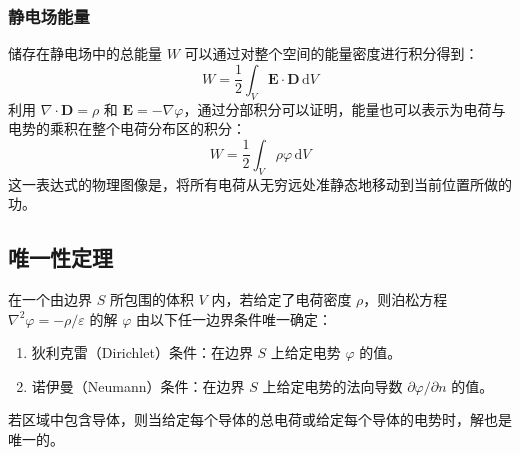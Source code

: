 \documentclass[fontset=none]{ctexart}
\begin{document}
\subsubsection{静电场能量}
储存在静电场中的总能量 $W$ 可以通过对整个空间的能量密度进行积分得到：
\begin{equation}
    W = \frac{1}{2} \int_V \bm{E} \cdot \bm{D} \, \mathrm{d}V
\end{equation}
利用 $\nabla \cdot \bm{D} = \rho$ 和 $\bm{E} = -\nabla \varphi$，通过分部积分可以证明，能量也可以表示为电荷与电势的乘积在整个电荷分布区的积分：
\begin{equation}
    W = \frac{1}{2} \int_V \rho \varphi \, \mathrm{d}V
\end{equation}
这一表达式的物理图像是，将所有电荷从无穷远处准静态地移动到当前位置所做的功。

\subsection{唯一性定理}
\begin{theorem}[唯一性定理]
在一个由边界 $S$ 所包围的体积 $V$ 内，若给定了电荷密度 $\rho$，则泊松方程 $\nabla^2 \varphi = -\rho/\varepsilon$ 的解 $\varphi$ 由以下任一边界条件唯一确定：
\begin{enumerate}
    \item 狄利克雷（Dirichlet）条件：在边界 $S$ 上给定电势 $\varphi$ 的值。
    \item 诺伊曼（Neumann）条件：在边界 $S$ 上给定电势的法向导数 $\partial \varphi / \partial n$ 的值。
\end{enumerate}
若区域中包含导体，则当给定每个导体的总电荷或给定每个导体的电势时，解也是唯一的。
\end{theorem}
\end{document}
